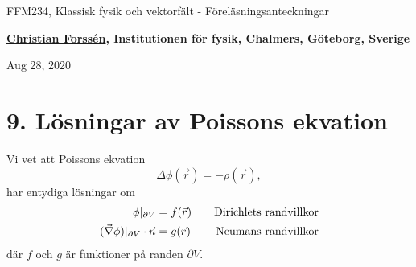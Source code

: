 \documentclass[%
oneside,                 %
final,                   %
10pt]{article}
\begin{document}

\newcommand{\exercisesection}[1]{\subsection*{#1}}







\thispagestyle{empty}

\begin{center}
{\LARGE\bf
\begin{spacing}{1.25}
FFM234, Klassisk fysik och vektorfält - Föreläsningsanteckningar
\end{spacing}
}
\end{center}


\begin{center}
{\bf \href{{http://fy.chalmers.se/subatom/tsp/}}{Christian Forssén}, Institutionen för fysik, Chalmers, Göteborg, Sverige${}^{}$} \\ [0mm]
\end{center}

\begin{center}
\end{center}
    

\begin{center}
Aug 28, 2020
\end{center}

\vspace{1cm}


\section*{9. Lösningar av Poissons ekvation}
Vi vet att Poissons ekvation
$$
\Delta \phi(\vec{r}) = - \rho(\vec{r}),
$$
har entydiga lösningar om
\begin{align}
\phi|_{\partial V} &= f(\vec{r}) \quad & \mathrm{Dirichlets~randvillkor} \nonumber \\
(\vec{\nabla}\phi)|_{\partial V} \cdot \vec{n} &= g(\vec{r}) \quad & \mathrm{Neumans~randvillkor} \nonumber 
\end{align}
där $f$ och $g$ är funktioner på randen $\partial V$.
\end{document}
